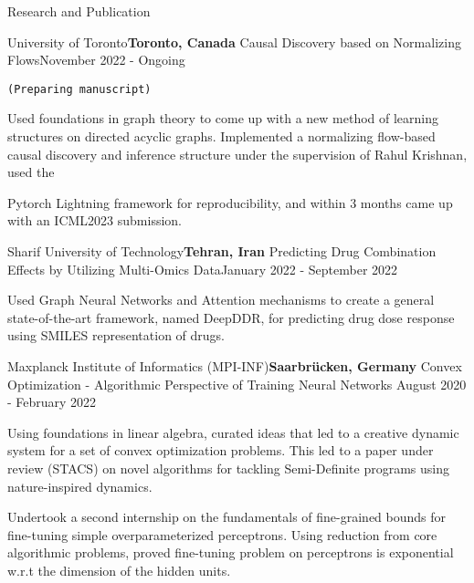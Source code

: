 \documentclass{resume} %
\begin{document}
\begin{rSection}{Research and Publication}

\begin{rSubsection}{University of Toronto}{\textcolor{Black!70}{\bf Toronto, Canada}}
{Causal Discovery based on Normalizing Flows}{\textcolor{Black!70}{November 2022 - Ongoing}}
\item {\tt (Preparing manuscript)}
\begin{small}
\item Used foundations in graph theory to come up with a new method of learning structures on directed acyclic graphs.
Implemented a normalizing flow-based causal discovery and inference structure under the supervision of Rahul Krishnan, used the
\item Pytorch Lightning framework for reproducibility, and within 3 months came up with an ICML2023 submission.
\end{small}
\end{rSubsection}

\begin{rSubsection}{Sharif University of Technology}{\textcolor{Black!70}{\bf Tehran, Iran}}
{Predicting Drug Combination Effects by Utilizing Multi-Omics Data}{\textcolor{Black!70}{January 2022 - September 2022}}
\begin{small}
\item Used Graph Neural Networks and Attention mechanisms to create a general state-of-the-art framework, named DeepDDR, for predicting drug dose response using SMILES representation of drugs.
\end{small}
\end{rSubsection}

\begin{rSubsection}{Maxplanck Institute of Informatics (MPI-INF)}{\textcolor{Black!70}{\bf Saarbrücken, Germany}}
{Convex Optimization - Algorithmic Perspective of Training Neural Networks}
{\textcolor{Black!70}{August 2020 - February 2022}}
\begin{small}
\item Using foundations in linear algebra, curated ideas that led to a creative dynamic system for a set of convex optimization problems. This led to a paper under review (STACS) on novel algorithms for tackling Semi-Definite programs using nature-inspired dynamics.
\item Undertook a second internship on the fundamentals of fine-grained bounds for fine-tuning simple overparameterized perceptrons. Using reduction from core algorithmic problems, proved fine-tuning problem on perceptrons is exponential w.r.t the dimension of the hidden units.
\end{small}
\end{rSubsection}


\end{rSection}
\end{document}
